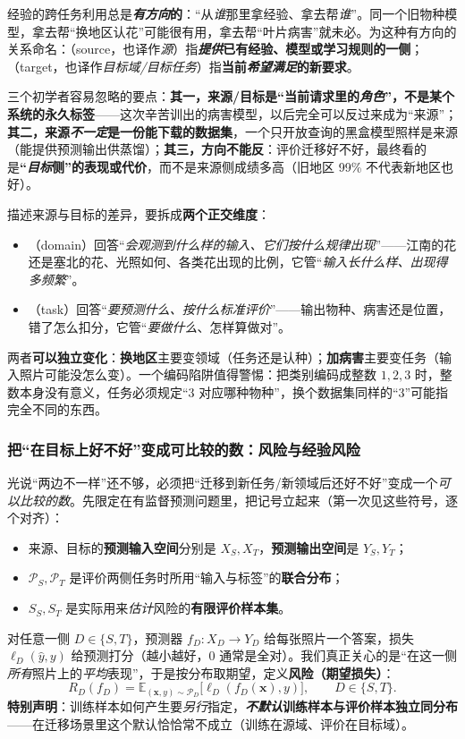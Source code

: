 经验的跨任务利用总是\textbf{\emph{有方向}的}：“从\emph{谁}那里拿经验、拿去帮\emph{谁}”。同一个旧物种模型，拿去帮“换地区认花”可能很有用，拿去帮“叶片病害”就未必。为这种有方向的关系命名：（source，也译作\emph{源}）指\textbf{\emph{提供}已有经验、模型或学习规则的一侧}；（target，也译作\emph{目标域/目标任务}）指\textbf{当前\emph{希望满足}的新要求}。

三个初学者容易忽略的要点：\textbf{其一，来源/目标是“当前请求里的\emph{角色}”，不是某个系统的永久标签}——这次辛苦训出的病害模型，以后完全可以反过来成为“来源”；\textbf{其二，来源\emph{不一定}是一份能下载的数据集}，一个只开放查询的黑盒模型照样是来源（能提供预测输出供蒸馏）；\textbf{其三，方向不能反}：评价迁移好不好，最终看的是\textbf{“\emph{目标}侧”的表现或代价}，而不是来源侧成绩多高（旧地区 99\% 不代表新地区也好）。

描述来源与目标的差异，要拆成\textbf{两个正交维度}：
\begin{itemize}\item {}（domain）回答“\emph{会观测到什么样的\emph{输入}、它们按什么规律出现}”——江南的花还是塞北的花、光照如何、各类花出现的比例，它管“\emph{输入长什么样、出现得多频繁}”。\item {}（task）回答“\emph{要预测\emph{什么}、按什么标准\emph{评价}}”——输出物种、病害还是位置，错了怎么扣分，它管“\emph{要做什么}、怎样算做对”。\end{itemize}
两者\textbf{可以独立变化}：\textbf{换地区}主要变领域（任务还是认种）；\textbf{加病害}主要变任务（输入照片可能没怎么变）。一个编码陷阱值得警惕：把类别编码成整数 $1,2,3$ 时，整数本身没有意义，任务必须规定“3 对应哪种物种”，换个数据集同样的“3”可能指完全不同的东西。

\subsubsection{把“在目标上好不好”变成可比较的数：风险与经验风险}

光说“两边不一样”还不够，必须把“迁移到新任务/新领域后还好不好”变成一个\emph{可以比较的数}。先限定在有监督预测问题里，把记号立起来（第一次见这些符号，逐个对齐）：
\begin{itemize}\item 来源、目标的\textbf{预测输入空间}分别是 $X_S,X_T$，\textbf{预测输出空间}是 $Y_S,Y_T$；\item $\mathcal P_S,\mathcal P_T$ 是评价两侧任务时所用“输入与标签”的\textbf{联合分布}；\item $S_S,S_T$ 是实际用来\emph{估计}风险的\textbf{有限评价样本集}。\end{itemize}
对任意一侧 $D\in\{S,T\}$，预测器 $f_D:X_D\to Y_D$ 给每张照片一个答案，损失 $\ell_D(\hat y,y)$ 给预测打分（越小越好，0 通常是全对）。我们真正关心的是“在这一侧\emph{所有}照片上的\emph{平均}表现”，于是按分布取期望，定义\textbf{风险（期望损失）}：
\begin{equation}
  R_D(f_D)=
  \mathbb E_{(\bm{x},y)\sim\mathcal P_D}
  \bigl[\ell_D(f_D(\bm{x}),y)\bigr],
  \qquad D\in\{S,T\}.
  \label{eq:kts-overview-risk}
\end{equation}
\textbf{特别声明}：训练样本如何产生要\emph{另行}指定，\textbf{\emph{不默认}训练样本与评价样本独立同分布}——在迁移场景里这个默认恰恰常不成立（训练在源域、评价在目标域）。

